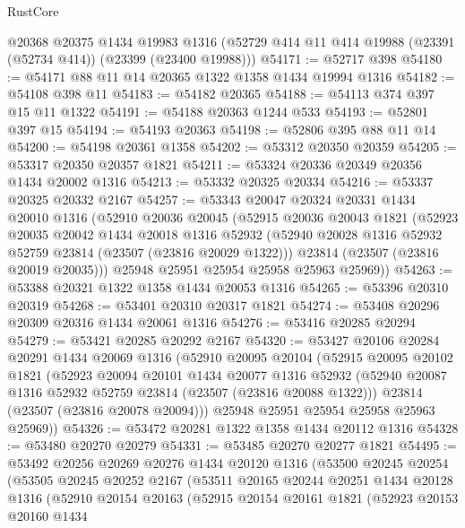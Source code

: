 \begin{lexlean}{RustCore}
\begin{coremodule}
    @20368
    @20375
    @1434
    @19983
    @1316
    (@52729 @414 @11 @414 @19988 (@23391 (@52734 @414)) (@23399 (@23400 @19988)))
@54171 := @52717 @398
@54180 := @54171 @88 @11 @14 @20365 @1322 @1358 @1434 @19994 @1316
@54182 := @54108 @398 @11
@54183 := @54182 @20365
@54188 := @54113 @374 @397 @15 @11 @1322
@54191 := @54188 @20363 @1244 @533
@54193 := @52801 @397 @15
@54194 := @54193 @20363
@54198 := @52806 @395 @88 @11 @14
@54200 := @54198 @20361 @1358
@54202 := @53312 @20350 @20359
@54205 := @53317 @20350 @20357 @1821
@54211 := @53324 @20336 @20349 @20356 @1434 @20002 @1316
@54213 := @53332 @20325 @20334
@54216 := @53337 @20325 @20332 @2167
@54257 := @53343
    @20047
    @20324
    @20331
    @1434
    @20010
    @1316
    (@52910
      @20036
      @20045
      (@52915
        @20036
        @20043
        @1821
        (@52923
          @20035
          @20042
          @1434
          @20018
          @1316
          @52932
          (@52940 @20028 @1316 @52932 @52759 @23814 (@23507 (@23816 @20029 @1322)))
          @23814
          (@23507 (@23816 @20019 @20035)))
        @25948
        @25951
        @25954
        @25958
        @25963
        @25969))
@54263 := @53388 @20321 @1322 @1358 @1434 @20053 @1316
@54265 := @53396 @20310 @20319
@54268 := @53401 @20310 @20317 @1821
@54274 := @53408 @20296 @20309 @20316 @1434 @20061 @1316
@54276 := @53416 @20285 @20294
@54279 := @53421 @20285 @20292 @2167
@54320 := @53427
    @20106
    @20284
    @20291
    @1434
    @20069
    @1316
    (@52910
      @20095
      @20104
      (@52915
        @20095
        @20102
        @1821
        (@52923
          @20094
          @20101
          @1434
          @20077
          @1316
          @52932
          (@52940 @20087 @1316 @52932 @52759 @23814 (@23507 (@23816 @20088 @1322)))
          @23814
          (@23507 (@23816 @20078 @20094)))
        @25948
        @25951
        @25954
        @25958
        @25963
        @25969))
@54326 := @53472 @20281 @1322 @1358 @1434 @20112 @1316
@54328 := @53480 @20270 @20279
@54331 := @53485 @20270 @20277 @1821
@54495 := @53492
    @20256
    @20269
    @20276
    @1434
    @20120
    @1316
    (@53500
      @20245
      @20254
      (@53505
        @20245
        @20252
        @2167
        (@53511
          @20165
          @20244
          @20251
          @1434
          @20128
          @1316
          (@52910
            @20154
            @20163
            (@52915
              @20154
              @20161
              @1821
              (@52923
                @20153
                @20160
                @1434

\end{coremodule}
\end{lexlean}
